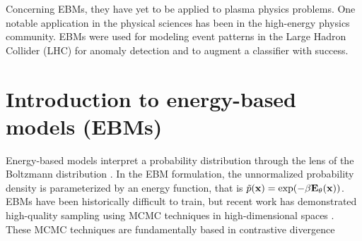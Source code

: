 Concerning EBMs, they have yet to be applied to plasma physics problems. One notable application in the physical sciences has been in the high-energy physics community. EBMs were used for modeling event patterns in the Large Hadron Collider (LHC) for anomaly detection and to augment a classifier \cite{cheng_versatile_2024} with success.




\section{Introduction to energy-based models (EBMs)}

Energy-based models interpret a probability distribution through the lens of the Boltzmann distribution \cite{hopfield_neural_1982, ackley_learning_1985, lecun_tutorial_2006}. In the EBM formulation, the unnormalized probability density is parameterized by an energy function, that is $\tilde{p}(\bf{x}) = \exp(-\beta E_\theta(\bf{x}))$. EBMs have been historically difficult to train, but recent work has demonstrated high-quality sampling using MCMC techniques in high-dimensional spaces \cite{du_model_2019, du_implicit_2020, du_improved_2021, du_compositional_2020, du_unsupervised_2021, nijkamp_anatomy_2020, nijkamp_learning_2019, deng_residual_2020}. These MCMC techniques are fundamentally based in contrastive divergence 

